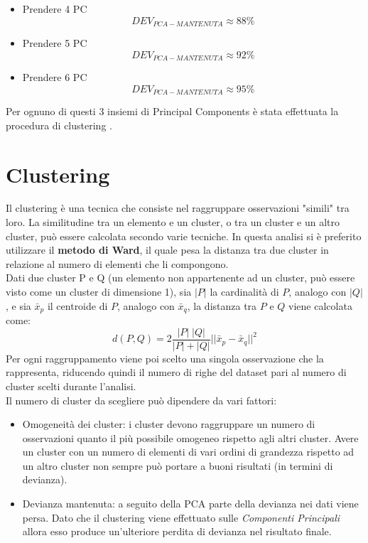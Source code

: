 \begin{itemize}
	\item Prendere 4 PC
	\begin{equation*}
		DEV_{PCA-MANTENUTA} \approx 88 \%
	\end{equation*}
	\item Prendere 5 PC
	\begin{equation*}
			DEV_{PCA-MANTENUTA} \approx 92 \%
	\end{equation*}
	\item Prendere 6 PC
	\begin{equation*}
			DEV_{PCA-MANTENUTA} \approx 95 \%
	\end{equation*}
\end{itemize}
Per ognuno di questi 3 insiemi di Principal Components è stata effettuata la procedura di clustering .

\section{Clustering}
Il clustering è una tecnica che consiste nel raggruppare osservazioni "simili" tra loro. La similitudine tra un elemento e un cluster, o tra un cluster e un altro cluster, può essere calcolata secondo varie tecniche. In questa analisi si è preferito utilizzare il \textbf{metodo di Ward}, il quale pesa la distanza tra due cluster in relazione al numero di elementi che li compongono.
\\Dati due cluster P e Q (un elemento non appartenente ad un cluster, può essere visto come un cluster di dimensione 1), sia $|P|$ la cardinalità di $P$, analogo con $|Q|$, e sia $\bar{x}_p$ il centroide di $P$, analogo con $\bar{x}_q$, la distanza tra $P$ e $Q$ viene calcolata come:
\begin{equation*}
	d(P,Q) = 2 \dfrac{|P| \; |Q|}{|P| + |Q|} ||\bar{x}_p - \bar{x}_q ||^2
\end{equation*}
Per ogni raggruppamento viene poi scelto una singola osservazione che la rappresenta, riducendo quindi il numero di righe del dataset pari al numero di cluster scelti durante l'analisi.
\\Il numero di cluster da scegliere può dipendere da vari fattori:
\begin{itemize}
	\item Omogeneità dei cluster: i cluster devono raggruppare un numero di osservazioni quanto il più possibile omogeneo rispetto agli altri cluster. Avere un cluster con un numero di elementi di vari ordini di grandezza rispetto ad un altro cluster non sempre può portare a buoni risultati (in termini di devianza).
	\item Devianza mantenuta: a seguito della PCA parte della devianza nei dati viene persa. Dato che il clustering viene effettuato sulle \textit{Componenti Principali} allora esso produce un'ulteriore perdita di devianza nel risultato finale.
\end{itemize}
